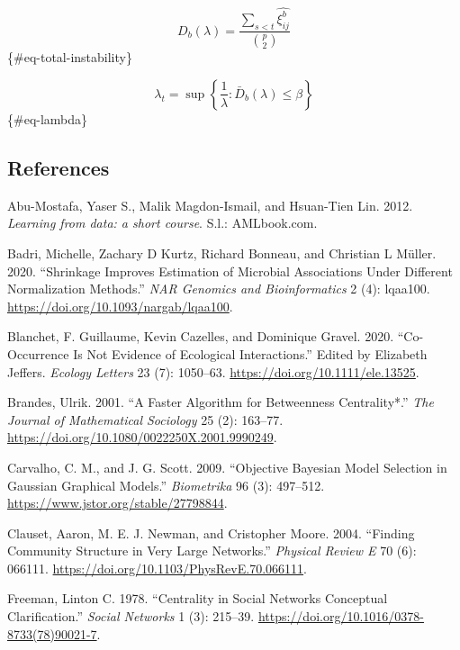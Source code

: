 \documentclass[
]{article}
\newlength{\cslhangindent}
\newlength{\cslentryspacingunit} %
\newenvironment{CSLReferences}[2] %
 {%
  \setlength{\parindent}{0pt}
  \ifodd #1
  \let\oldpar\par
  \def\par{\hangindent=\cslhangindent\oldpar}
  \fi
  \setlength{\parskip}{#2\cslentryspacingunit}
 }%
 {}
\begin{document}
\[
D_b(\lambda) = \frac{\sum_{s<t}\hat{\xi^b_{ij}}}{{p \choose 2}}
\] \{\#eq-total-instability\}

\[
\lambda_t = \sup\left\{ \frac{1}{\lambda} : \bar D_b(\lambda) \leq \beta \right \}
\] \{\#eq-lambda\}

\hypertarget{references}{%
\subsection*{References}\label{references}}

\hypertarget{refs}{}
\begin{CSLReferences}{1}{0}
\leavevmode{}%
Abu-Mostafa, Yaser S., Malik Magdon-Ismail, and Hsuan-Tien Lin. 2012.
\emph{Learning from data: a short course}. S.l.: AMLbook.com.

\leavevmode{}%
Badri, Michelle, Zachary D Kurtz, Richard Bonneau, and Christian L
Müller. 2020. {``Shrinkage Improves Estimation of Microbial Associations
Under Different Normalization Methods.''} \emph{NAR Genomics and
Bioinformatics} 2 (4): lqaa100.
\url{https://doi.org/10.1093/nargab/lqaa100}.

\leavevmode{}%
Blanchet, F. Guillaume, Kevin Cazelles, and Dominique Gravel. 2020.
{``Co{-}Occurrence Is Not Evidence of Ecological Interactions.''} Edited
by Elizabeth Jeffers. \emph{Ecology Letters} 23 (7): 1050--63.
\url{https://doi.org/10.1111/ele.13525}.

\leavevmode{}%
Brandes, Ulrik. 2001. {``A Faster Algorithm for Betweenness
Centrality*.''} \emph{The Journal of Mathematical Sociology} 25 (2):
163--77. \url{https://doi.org/10.1080/0022250X.2001.9990249}.

\leavevmode{}%
Carvalho, C. M., and J. G. Scott. 2009. {``Objective Bayesian Model
Selection in Gaussian Graphical Models.''} \emph{Biometrika} 96 (3):
497--512. \url{https://www.jstor.org/stable/27798844}.

\leavevmode{}%
Clauset, Aaron, M. E. J. Newman, and Cristopher Moore. 2004. {``Finding
Community Structure in Very Large Networks.''} \emph{Physical Review E}
70 (6): 066111. \url{https://doi.org/10.1103/PhysRevE.70.066111}.

\leavevmode{}%
Freeman, Linton C. 1978. {``Centrality in Social Networks Conceptual
Clarification.''} \emph{Social Networks} 1 (3): 215--39.
\url{https://doi.org/10.1016/0378-8733(78)90021-7}.


\end{CSLReferences}
\end{document}
